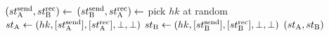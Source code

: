 \algrenewcommand\textproc{}
\algrenewcommand{}

\begin{minipage}{\linewidth}
  {\fontsize{8}{10}\selectfont
  \begin{algorithmic}[1]
    \State $(st_\text{A}^\text{send},st_\text{B}^\text{rec}) \gets$ 
    \State $(st_\text{B}^\text{send},st_\text{A}^\text{rec}) \gets$ 
    \State pick $hk$ at random
    \State $st_\text{A} \gets (hk, [st_\text{A}^\text{send}], [st_\text{A}^\text{rec}],\perp,\perp)$ 
    \State $st_\text{B} \gets (hk, [st_\text{B}^\text{send}], [st_\text{B}^\text{rec}],\perp,\perp)$ 
    \State \Return $(st_\text{A},st_\text{B})$
    \EndProcedure
  \end{algorithmic}
  }
\end{minipage}
